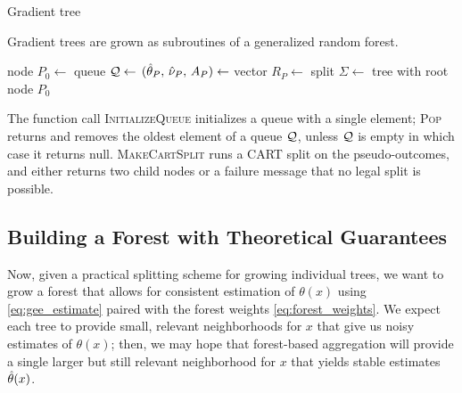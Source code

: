 \documentclass[aos]{imsart}
\theoremstyle{plain}
\theoremstyle{definition}
\theoremstyle{remark}
\begin{document}
\begin{CJK}{UTF8}{gbsn}
\begin{algorithm}[t]
\caption{Gradient tree}\label{alg:tree}
\vspace{-0.4\baselineskip}
\justify
Gradient trees are grown as subroutines of a generalized random forest.
\begin{algorithmic}[1]
\State node $P_0 \gets$ 
\State queue $\mathcal{Q} \gets$ 
\State $(\hat{\theta}_P, \, \hat{\nu}_P, \, A_P) \gets$ 
\State vector $R_P \gets$ 
\State split $\Sigma \gets$ 
\State {}
\State {}
\State {}
\EndIf
\EndWhile
{} tree with root node $P_0$
\EndProcedure
\end{algorithmic}
\justify
The function call \textsc{InitializeQueue} initializes a queue with a single element;
\textsc{Pop} returns and removes the oldest element of a queue $\mathcal{Q}$,
unless $\mathcal{Q}$ is empty in which case it returns null. \textsc{MakeCartSplit} runs a CART split
on the pseudo-outcomes, and either returns two child nodes or a failure message that no legal
split is possible.
\end{algorithm}


\subsection{Building a Forest with Theoretical Guarantees}
\label{sec:implementation}

Now, given a practical splitting scheme for growing individual trees, we want to
grow a forest that allows for consistent estimation of $\theta(x)$ using \eqref{eq:gee_estimate}
paired with the forest weights \eqref{eq:forest_weights}. We expect each
tree to provide small, relevant neighborhoods for $x$ that give us noisy estimates of $\theta(x)$;
then, we may hope that
forest-based aggregation will provide a single larger but still relevant neighborhood for $x$
that yields stable estimates $\hat{\theta}(x)$.


\end{CJK}
\end{document}
